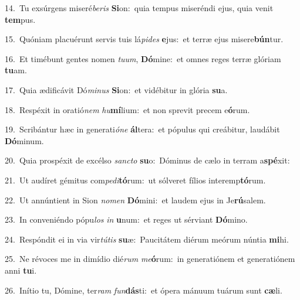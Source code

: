 {\numbfont\textcolor{\numbcolor}{14.}}~Tu exsúrgens miseré\-\textit{be}\-\textit{ris} \textbf{Si}\-on:~\star quia tempus miseréndi ejus, quia venit \textbf{tem}\-pus.\par
{\numbfont\textcolor{\numbcolor}{15.}}~Quóniam placuérunt servis tuis lá\-\textit{pi}\-\textit{des} \textbf{e}\-jus:~\star et terræ ejus misere\-\textbf{bún}\-tur.\par
{\numbfont\textcolor{\numbcolor}{16.}}~Et timébunt gentes nomen \textit{tu}\-\textit{um}, \textbf{Dó}\-mine:~\star et omnes reges terræ glóriam \textbf{tu}\-am.\par
{\numbfont\textcolor{\numbcolor}{17.}}~Quia ædificávit Dó\-\textit{mi}\-\textit{nus} \textbf{Si}\-on:~\star et vidébitur in glória \textbf{su}\-a.\par
{\numbfont\textcolor{\numbcolor}{18.}}~Respéxit in oratió\textit{nem} \textit{hu}\-\textbf{mí}lium:~\star et non sprevit precem e\-\textbf{ó}\-rum.\par
{\numbfont\textcolor{\numbcolor}{19.}}~Scribántur hæc in generati\-\textit{ó}\-\textit{ne} \textbf{ál}\-tera:~\star et pópulus qui creábitur, laudábit \textbf{Dó}\-minum.\par
{\numbfont\textcolor{\numbcolor}{20.}}~Quia prospéxit de excélso \textit{sanc}\-\textit{to} \textbf{su}\-o:~\star Dóminus de cælo in terram a\-\textbf{spé}\-xit:\par
{\numbfont\textcolor{\numbcolor}{21.}}~Ut audíret gémitus com\-\textit{pe}\-\textit{di}\textbf{tó}rum:~\star ut sólveret fílios interemp\-\textbf{tó}\-rum.\par
{\numbfont\textcolor{\numbcolor}{22.}}~Ut annúntient in Sion \textit{no}\-\textit{men} \textbf{Dó}\-mini:~\star et laudem ejus in Je\-\textbf{rú}\-salem.\par
{\numbfont\textcolor{\numbcolor}{23.}}~In conveniéndo pópu\textit{los} \textit{in} \textbf{u}\-num:~\star et reges ut sérviant \textbf{Dó}\-mino.\par
{\numbfont\textcolor{\numbcolor}{24.}}~Respóndit ei in via vir\-\textit{tú}\-\textit{tis} \textbf{su}\-æ:~\star Paucitátem diérum meórum núntia \textbf{mi}\-hi.\par
{\numbfont\textcolor{\numbcolor}{25.}}~Ne révoces me in dimídio dié\textit{rum} \textit{me}\-\textbf{ó}rum:~\star in generatiónem et generatiónem anni \textbf{tu}\-i.\par
{\numbfont\textcolor{\numbcolor}{26.}}~Inítio tu, Dómine, ter\textit{ram} \textit{fun}\-\textbf{dás}ti:~\star et ópera mánuum tuárum sunt \textbf{cæ}\-li.\par
